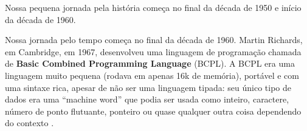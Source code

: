Nossa pequena jornada pela história começa no final da década de 1950 e início
da década de 1960. 

Nossa jornada pelo tempo começa no final da década de 1960. Martin Richards, em
Cambridge, em 1967, desenvolveu uma linguagem de programação chamada de
\textbf{Basic Combined Programming Language} (BCPL). A BCPL era uma linguagem
muito pequena (rodava em apenas 16k de memória), portável e com uma sintaxe
rica, apesar de não ser uma linguagem tipada: seu único tipo de dados era uma
``machine word'' que podia ser usada como inteiro, caractere, número de ponto
flutuante, ponteiro ou quase qualquer outra coisa dependendo do contexto
\cite{raymond91}.
